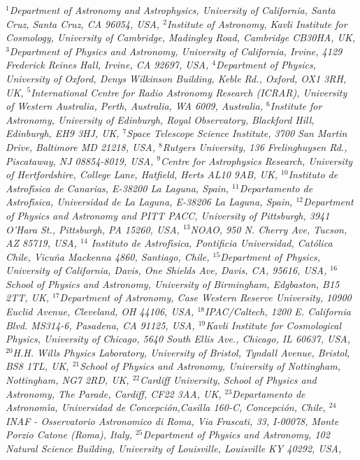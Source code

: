 {\justify\it\small
$^{1}$Department of Astronomy and Astrophysics, University of California, Santa Cruz, Santa Cruz, CA 96054, USA,
$^{2}$Institute of Astronomy, Kavli Institute for Cosmology, University of Cambridge, Madingley Road, Cambridge CB30HA, UK,
$^{3}$Department of Physics and Astronomy, University of California, Irvine, 4129 Frederick Reines Hall, Irvine, CA 92697, USA,
$^{4}$Department of Physics, University of Oxford, Denys Wilkinson Building, Keble Rd., Oxford, OX1 3RH, UK,
$^{5}$International Centre for Radio Astronomy Research (ICRAR), University of Western Australia, Perth, Australia, WA 6009, Australia,
$^{6}$Institute for Astronomy, University of Edinburgh, Royal Observatory, Blackford Hill, Edinburgh, EH9 3HJ, UK,
$^{7}$Space Telescope Science Institute, 3700 San Martin Drive, Baltimore MD 21218, USA,
$^{8}$Rutgers University, 136 Frelinghuysen Rd., Piscataway, NJ 08854-8019, USA,
$^{9}$Centre for Astrophysics Research, University of Hertfordshire, College Lane, Hatfield, Herts AL10 9AB, UK,
$^{10}$Instituto de Astrof\'\i sica de Canarias, E-38200 La Laguna, Spain,
$^{11}$Departamento de Astrof\'\i sica, Universidad de La Laguna, E-38206 La Laguna, Spain,
$^{12}$Department of Physics and Astronomy and PITT PACC, University of Pittsburgh, 3941 O{'}Hara St., Pittsburgh, PA 15260, USA,
$^{13}$NOAO, 950 N. Cherry Ave, Tucson, AZ 85719, USA,
$^{14}$ Instituto de Astrof\'\i sica, Pontificia Universidad,
Cat{\'{o}}lica Chile, Vicu{\~{n}}a Mackenna 4860, Santiago, Chile,
$^{15}$Department of Physics, University of California, Davis, One Shields Ave, Davis, CA, 95616, USA,
$^{16}$School of Physics and Astronomy, University of Birmingham, Edgbaston, B15 2TT, UK,
$^{17}$Department of Astronomy, Case Western Reserve University, 10900 Euclid Avenue, Cleveland, OH 44106, USA,
$^{18}$IPAC/Caltech, 1200 E. California Blvd. MS314-6, Pasadena, CA 91125, USA,
$^{19}$Kavli Institute for Cosmological Physics, University of Chicago, 5640 South Ellis Ave., Chicago, IL 60637, USA,
$^{20}$H.H. Wills Physics Laboratory, University of Bristol, Tyndall Avenue, Bristol, BS8 1TL, UK,
$^{21}$School of Physics and Astronomy, University of Nottingham, Nottingham, NG7 2RD, UK,
$^{22}$Cardiff University, School of Physics and Astronomy, The Parade, Cardiff, CF22 3AA, UK,
$^{23}$Departamento de Astronom\'\i a, Universidad de Concepci{\'{o}}n,Casilla 160-C, Concepci{\'{o}}n, Chile,
$^{24}$INAF - Osservatorio Astronomico di Roma, Via Frascati, 33, I-00078, Monte Porzio Catone (Roma), Italy,
$^{25}$Department of Physics and Astronomy, 102 Natural Science Building, University of Louisville, Louisville KY 40292, USA,
}
